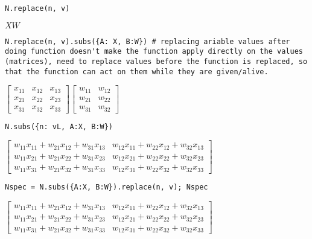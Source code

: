 \documentclass[
]{article}
\begin{document}
\begin{verbatim}
N.replace(n, v)
\end{verbatim}

\(\displaystyle X W\)

\begin{verbatim}
N.replace(n, v).subs({A: X, B:W}) # replacing ariable values after doing function doesn't make the function apply directly on the values (matrices), need to replace values before the function is replaced, so that the function can act on them while they are given/alive.
\end{verbatim}

\(\displaystyle \left[\begin{matrix}x_{11} & x_{12} & x_{13}\\x_{21} & x_{22} & x_{23}\\x_{31} & x_{32} & x_{33}\end{matrix}\right] \left[\begin{matrix}w_{11} & w_{12}\\w_{21} & w_{22}\\w_{31} & w_{32}\end{matrix}\right]\)

\begin{verbatim}
N.subs({n: vL, A:X, B:W})
\end{verbatim}

\(\displaystyle \left[\begin{matrix}w_{11} x_{11} + w_{21} x_{12} + w_{31} x_{13} & w_{12} x_{11} + w_{22} x_{12} + w_{32} x_{13}\\w_{11} x_{21} + w_{21} x_{22} + w_{31} x_{23} & w_{12} x_{21} + w_{22} x_{22} + w_{32} x_{23}\\w_{11} x_{31} + w_{21} x_{32} + w_{31} x_{33} & w_{12} x_{31} + w_{22} x_{32} + w_{32} x_{33}\end{matrix}\right]\)

\begin{verbatim}
Nspec = N.subs({A:X, B:W}).replace(n, v); Nspec
\end{verbatim}

\(\displaystyle \left[\begin{matrix}w_{11} x_{11} + w_{21} x_{12} + w_{31} x_{13} & w_{12} x_{11} + w_{22} x_{12} + w_{32} x_{13}\\w_{11} x_{21} + w_{21} x_{22} + w_{31} x_{23} & w_{12} x_{21} + w_{22} x_{22} + w_{32} x_{23}\\w_{11} x_{31} + w_{21} x_{32} + w_{31} x_{33} & w_{12} x_{31} + w_{22} x_{32} + w_{32} x_{33}\end{matrix}\right]\)
\end{document}
